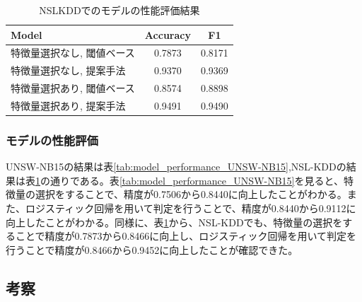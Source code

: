 \documentclass{css}
\begin{document}
\begin{table}[ht]
    \caption{NSLKDDでのモデルの性能評価結果}
    \centering
    \footnotesize
    \begin{tabular}{lcc}
        \hline\hline
        Model & Accuracy & F1 \\
        \hline
        特徴量選択なし, 閾値ベース& 0.7873 & 0.8171 \\
        特徴量選択なし, 提案手法 & 0.9370 & 0.9369 \\ 
        特徴量選択あり, 閾値ベース& 0.8574 & 0.8898 \\
        特徴量選択あり, 提案手法 & 0.9491 & 0.9490 \\
        \hline
    \end{tabular}
    \label{tab:model_performance_NSL-KDD}
\end{table}

\subsubsection{モデルの性能評価}
UNSW-NB15の結果は表\ref{tab:model_performance_UNSW-NB15},NSL-KDDの結果は表\ref{tab:model_performance_NSL-KDD}の通りである。表\ref{tab:model_performance_UNSW-NB15}を見ると、特徴量の選択をすることで、精度が0.7506から0.8440に向上したことがわかる。また、ロジスティック回帰を用いて判定を行うことで、精度が0.8440から0.9112に向上したことがわかる。同様に、表\ref{tab:model_performance_NSL-KDD}から、NSL-KDDでも、特徴量の選択をすることで精度が0.7873から0.8466に向上し、ロジスティック回帰を用いて判定を行うことで精度が0.8466から0.9452に向上したことが確認できた。

\subsection{考察}
\end{document}
